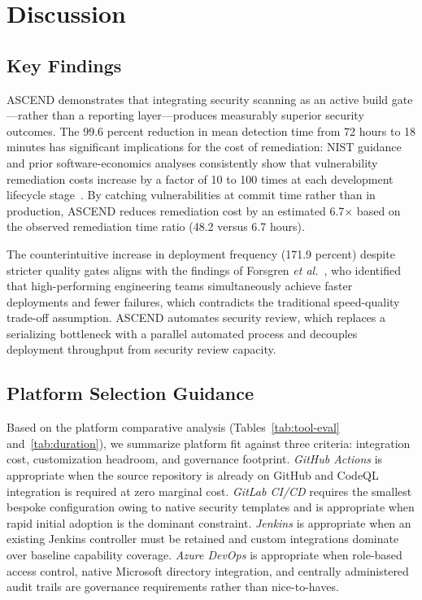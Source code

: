 \documentclass{ieeeaccess}
\begin{document}
\section{Discussion}
\label{sec:discussion}

\subsection{Key Findings}
ASCEND demonstrates that integrating security scanning as an active build gate---rather than a reporting layer---produces measurably superior security outcomes. The 99.6 percent reduction in mean detection time from 72 hours to 18 minutes has significant implications for the cost of remediation: NIST guidance and prior software-economics analyses consistently show that vulnerability remediation costs increase by a factor of 10 to 100 times at each development lifecycle stage~\cite{boehm1981software}. By catching vulnerabilities at commit time rather than in production, ASCEND reduces remediation cost by an estimated 6.7$\times$ based on the observed remediation time ratio (48.2 versus 6.7 hours).

The counterintuitive increase in deployment frequency (171.9 percent) despite stricter quality gates aligns with the findings of Forsgren \emph{et al.}~\cite{forsgren2018accelerate}, who identified that high-performing engineering teams simultaneously achieve faster deployments and fewer failures, which contradicts the traditional speed-quality trade-off assumption. ASCEND automates security review, which replaces a serializing bottleneck with a parallel automated process and decouples deployment throughput from security review capacity.

\subsection{Platform Selection Guidance}
Based on the platform comparative analysis (Tables~\ref{tab:tool-eval} and~\ref{tab:duration}), we summarize platform fit against three criteria: integration cost, customization headroom, and governance footprint. \emph{GitHub Actions} is appropriate when the source repository is already on GitHub and CodeQL integration is required at zero marginal cost. \emph{GitLab CI/CD} requires the smallest bespoke configuration owing to native security templates and is appropriate when rapid initial adoption is the dominant constraint. \emph{Jenkins} is appropriate when an existing Jenkins controller must be retained and custom integrations dominate over baseline capability coverage. \emph{Azure DevOps} is appropriate when role-based access control, native Microsoft directory integration, and centrally administered audit trails are governance requirements rather than nice-to-haves.
\end{document}
